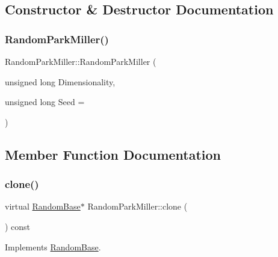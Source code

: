 \subsection{Constructor \& Destructor Documentation}
\hypertarget{classRandomParkMiller_a60884154bf954e8b5a7fcbcc41772cfd}{}\label{classRandomParkMiller_a60884154bf954e8b5a7fcbcc41772cfd} 
\subsubsection{\texorpdfstring{Random\+Park\+Miller()}{RandomParkMiller()}}
{\footnotesize\ttfamily Random\+Park\+Miller\+::\+Random\+Park\+Miller (\begin{DoxyParamCaption}\item[{unsigned long}]{Dimensionality,  }\item[{unsigned long}]{Seed = {} }\end{DoxyParamCaption})}



\subsection{Member Function Documentation}
\hypertarget{classRandomParkMiller_abeadf7c9bd2549c604b56b4fbf05278d}{}\label{classRandomParkMiller_abeadf7c9bd2549c604b56b4fbf05278d} 
\subsubsection{\texorpdfstring{clone()}{clone()}}
{\footnotesize\ttfamily virtual \hyperlink{classRandomBase}{Random\+Base}$\ast$ Random\+Park\+Miller\+::clone (\begin{DoxyParamCaption}{ }\end{DoxyParamCaption}) const\hspace{0.3cm}{\ttfamily [virtual]}}



Implements \hyperlink{classRandomBase_a0906f4590283535ec40427ad31ba7850}{Random\+Base}.

\hypertarget{classRandomParkMiller_a100f104e3e067070906db8847be9b5d7}{}\label{classRandomParkMiller_a100f104e3e067070906db8847be9b5d7} 
